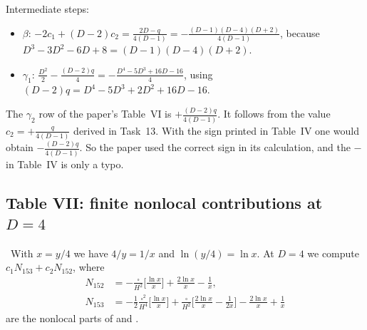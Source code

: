 Intermediate steps:
\begin{itemize}[leftmargin=*,itemsep=2pt]
\item $\beta$: $-2c_1+(D-2)c_2=\frac{2D-q}{4(D-1)}=-\frac{(D-1)(D-4)(D+2)}{4(D-1)}$, because $D^3-3D^2-6D+8=(D-1)(D-4)(D+2)$.
\item $\gamma_1$: $\frac{D^2}2-\frac{(D-2)q}4=-\frac{D^4-5D^3+16D-16}{4}$, using $(D-2)q=D^4-5D^3+2D^2+16D-16$.
\end{itemize}

\begin{discbox}
The $\gamma_2$ row of the paper's Table~VI is $+\frac{(D-2)q}{4(D-1)}$. It follows from the value $c_2=+\frac{q}{4(D-1)}$ derived in Task~13.
With the sign printed in Table~IV one would obtain $-\frac{(D-2)q}{4(D-1)}$.
So the paper used the correct sign in its calculation, and the $-$ in Table~IV is only a typo.
\end{discbox}

\subsection{Table VII: finite nonlocal contributions at $D=4$}
\tD\ With $x=y/4$ we have $4/y=1/x$ and $\ln(y/4)=\ln x$. At $D=4$ we compute $c_1N_{153}+c_2N_{152}$, where
\begin{equation}
\begin{aligned}
N_{152}&=-\frac{\square}{H^2}\Big[\frac{\ln x}{x}\Big]+\frac{2\ln x}{x}-\frac1x,\\
N_{153}&=-\frac12\frac{\square^2}{H^4}\Big[\frac{\ln x}{x}\Big]+\frac{\square}{H^2}\Big[\frac{2\ln x}{x}-\frac1{2x}\Big]-\frac{2\ln x}{x}+\frac1x
\end{aligned}
\label{eq:ch08-N}
\end{equation}
are the nonlocal parts of  and .

